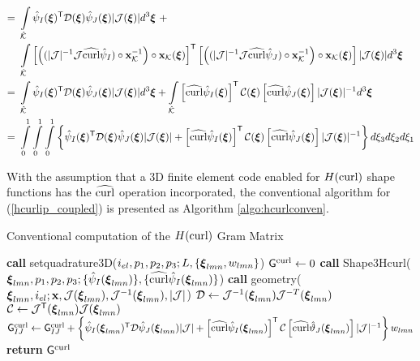 \begin{align}
                =\ & \int\limits_{\hat{\mathcal{K}}}
                \hat{ \psi}_I(\boldsymbol{\xi})^{\mathsf{T}}\mathcal{D}(\boldsymbol{\xi})\hat{ \psi}_J(\boldsymbol{\xi})|\mathcal{J}(\boldsymbol{\xi})|d^3\boldsymbol{\xi} \ +\nonumber\\*
                \ & \int\limits_{\hat{\mathcal{K}}}
                \left[\left((|\mathcal{J}|^{-1}\mathcal{J}\widehat{\operatorname{curl}}\hat{ \psi}_I)\circ\mathbf{x}_{\mathcal{K}}^{-1}\right)\circ\mathbf{x}_{\mathcal{K}}(\boldsymbol{\xi})\right]^{\mathsf{T}} \left[\left((|\mathcal{J}|^{-1}\mathcal{J}\widehat{\operatorname{curl}}\hat{ \psi}_J)\circ\mathbf{x}_{\mathcal{K}}^{-1}\right)\circ\mathbf{x}_{\mathcal{K}}(\boldsymbol{\xi})\right]|\mathcal{J}(\boldsymbol{\xi})|d^3\boldsymbol{\xi} \nonumber\\ 
                =\ & \int\limits_{\hat{\mathcal{K}}}
                \hat{ \psi}_I(\boldsymbol{\xi})^{\mathsf{T}}\mathcal{D}(\boldsymbol{\xi})\hat{ \psi}_J(\boldsymbol{\xi})|\mathcal{J}(\boldsymbol{\xi})|d^3\boldsymbol{\xi} +
                \int\limits_{\hat{\mathcal{K}}} \left[\widehat{\operatorname{curl}}\hat{ \psi}_I(\boldsymbol{\xi})\right]^{\mathsf{T}}\mathcal{C}(\boldsymbol{\xi})\left[\widehat{\operatorname{curl}}\hat{ \psi}_J(\boldsymbol{\xi})\right]|\mathcal{J}(\boldsymbol{\xi})|^{-1}d^3\boldsymbol{\xi} \nonumber \\ 
                =\ & \int\limits_0^1\int\limits_0^1\int\limits_0^1\left\{\hat{ \psi}_I(\boldsymbol{\xi})^{\mathsf{T}}\mathcal{D}(\boldsymbol{\xi})\hat{ \psi}_J(\boldsymbol{\xi})|\mathcal{J}(\boldsymbol{\xi})| +\left[\widehat{\operatorname{curl}}\hat{ \psi}_I(\boldsymbol{\xi})\right]^{\mathsf{T}}\mathcal{C}(\boldsymbol{\xi})\left[\widehat{\operatorname{curl}}\hat{\psi}_J(\boldsymbol{\xi})\right]|\mathcal{J}(\boldsymbol{\xi})|^{-1}\right\} d\xi_3d\xi_2d\xi_1
    \label{hcurlip_coupled}
\end{align}

With the assumption that a 3D finite element code enabled for $H(\operatorname{curl})$ shape functions has the $\widehat{\operatorname{curl}}$ operation incorporated, the conventional algorithm for (\ref{hcurlip_coupled}) is presented as Algorithm \ref{algo:hcurlconven}.
% 
\begin{algorithm}[ht]
\caption{Conventional computation of the $H(\operatorname{curl})$ Gram Matrix}\label{algo:hcurlconven}
\begin{algorithmic}
\State\textbf{call }setquadrature3D($i_{el},p_1,p_2,p_3;L,\{\boldsymbol{\xi}_{lmn},w_{lmn}\}$)
\State $\mathsf{G}^{\operatorname{curl}} \gets 0$
            \State\textbf{call } Shape3Hcurl($\boldsymbol{\xi}_{lmn},p_1,p_2,p_3;\{\hat{\psi}_I(\boldsymbol{\xi}_{lmn})\},\{\widehat{\operatorname{curl}}\hat{\psi}_I(\boldsymbol{\xi}_{lmn})\}$)
            \State\textbf{call } geometry( $\boldsymbol{\xi}_{lmn},i_{el};\mathbf{x},\mathcal{J}(\boldsymbol{\xi}_{lmn}),\mathcal{J}^{-1}(\boldsymbol{\xi}_{lmn}),|\mathcal{J}|$)
            \State $\mathcal{D}\gets\mathcal{J}^{-1}(\boldsymbol{\xi}_{lmn})\mathcal{J}^{-T}(\boldsymbol{\xi}_{lmn})$
            \State $\mathcal{C}\gets\mathcal{J}^{\mathsf{T}}(\boldsymbol{\xi}_{lmn})\mathcal{J}(\boldsymbol{\xi}_{lmn})$
                    \State $\mathsf{G}_{IJ}^{\operatorname{curl}} \gets \mathsf{G}_{IJ}^{\operatorname{curl}}+\left\{\hat{\psi}_I(\boldsymbol{\xi}_{lmn})^{\mathsf{T}}\mathcal{D}\hat{\psi}_J(\boldsymbol{\xi}_{lmn})|\mathcal{J}| + \left[\widehat{\operatorname{curl}}\hat{\psi}_I(\boldsymbol{\xi}_{lmn})\right]^{\mathsf{T}}\mathcal{C}\left[\widehat{\operatorname{curl}}\hat{\vartheta}_J(\boldsymbol{\xi}_{lmn}) \right]|\mathcal{J}|^{-1}\right\}w_{lmn}$
                \EndFor
            \EndFor
\EndFor
\State \textbf{return} $\mathsf{G}^{\operatorname{curl}}$
\EndProcedure
\end{algorithmic}
\end{algorithm}

